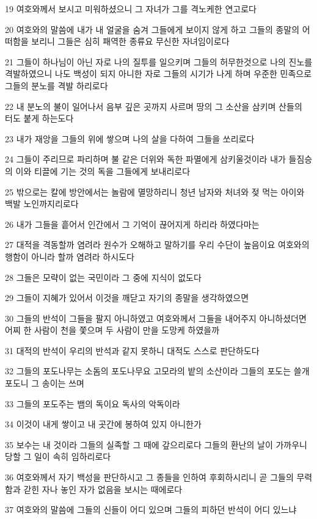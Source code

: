 \par 19 여호와께서 보시고 미워하셨으니 그 자녀가 그를 격노케한 연고로다
\par 20 여호와의 말씀에 내가 내 얼굴을 숨겨 그들에게 보이지 않게 하고 그들의 종말의 어떠함을 보리니 그들은 심히 패역한 종류요 무신한 자녀임이로다
\par 21 그들이 하나님이 아닌 자로 나의 질투를 일으키며 그들의 허무한것으로 나의 진노를 격발하였으니 나도 백성이 되지 아니한 자로 그들의 시기가 나게 하며 우준한 민족으로 그들의 분노를 격발 하리로다
\par 22 내 분노의 불이 일어나서 음부 깊은 곳까지 사르며 땅의 그 소산을 삼키며 산들의 터도 붙게 하는도다
\par 23 내가 재앙을 그들의 위에 쌓으며 나의 살을 다하여 그들을 쏘리로다
\par 24 그들이 주리므로 파리하며 불 같은 더위와 독한 파멸에게 삼키울것이라 내가 들짐승의 이와 티끌에 기는 것의 독을 그들에게 보내리로다
\par 25 밖으로는 칼에 방안에서는 놀람에 멸망하리니 청년 남자와 처녀와 젖 먹는 아이와 백발 노인까지리로다
\par 26 내가 그들을 흩어서 인간에서 그 기억이 끊어지게 하리라 하였다마는
\par 27 대적을 격동할까 염려라 원수가 오해하고 말하기를 우리 수단이 높음이요 여호와의 행함이 아니라 할까 염려라 하시도다
\par 28 그들은 모략이 없는 국민이라 그 중에 지식이 없도다
\par 29 그들이 지혜가 있어서 이것을 깨닫고 자기의 종말을 생각하였으면
\par 30 그들의 반석이 그들을 팔지 아니하였고 여호와께서 그들을 내어주지 아니하셨더면 어찌 한 사람이 천을 쫓으며 두 사람이 만을 도망케 하였을까
\par 31 대적의 반석이 우리의 반석과 같지 못하니 대적도 스스로 판단하도다
\par 32 그들의 포도나무는 소돔의 포도나무요 고모라의 밭의 소산이라 그들의 포도는 쓸개포도니 그 송이는 쓰며
\par 33 그들의 포도주는 뱀의 독이요 독사의 악독이라
\par 34 이것이 내게 쌓이고 내 곳간에 봉하여 있지 아니한가
\par 35 보수는 내 것이라 그들의 실족할 그 때에 갚으리로다 그들의 환난의 날이 가까우니 당할 그 일이 속히 임하리로다
\par 36 여호와께서 자기 백성을 판단하시고 그 종들을 인하여 후회하시리니 곧 그들의 무력함과 갇힌 자나 놓인 자가 없음을 보시는 때에로다
\par 37 여호와의 말씀에 그들의 신들이 어디 있으며 그들의 피하던 반석이 어디 있느냐
